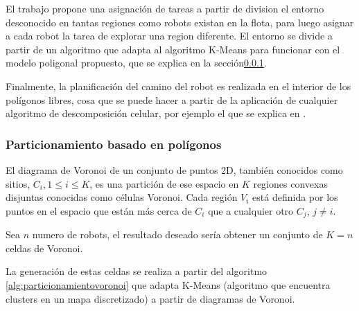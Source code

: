 El trabajo propone una asignación de tareas a partir de division el entorno desconocido en tantas regiones como robots existan en la flota, para luego asignar a cada robot la tarea de explorar una region diferente. El entorno se divide a partir de un algoritmo que adapta al algoritmo K-Means para funcionar con el modelo poligonal propuesto, que se explica en la sección\ref{subsubsec:particionamientovoronoi}.


Finalmente, la planificación del camino del robot es realizada en el interior de los polígonos libres, cosa que se puede hacer a partir de la aplicación de cualquier algoritmo de descomposición celular, por ejemplo el que se explica en \cite{schachter1978decomposition}.


   
\subsubsection{Particionamiento basado en polígonos}\label{subsubsec:particionamientovoronoi}
El diagrama de Voronoi\cite{fortune1987sweepline} de un conjunto de puntos 2D, también conocidos como sitios, $C_{i} , 1 \leq i \leq K$, es una partición de ese espacio en $K$ regiones convexas disjuntas conocidas como células Voronoi. Cada región $V_i$ está definida por los puntos en el espacio que están más cerca de $C_{i}$ que a cualquier otro $C_{j}$, $j\neq i$. 

Sea $n$ numero de robots, el resultado deseado sería obtener un conjunto de $K=n$ celdas de Voronoi. %

La generación de estas celdas se realiza a partir del algoritmo \ref{alg:particionamientovoronoi} que adapta K-Means (algoritmo que encuentra clusters en un mapa discretizado) a partir de diagramas de Voronoi.

